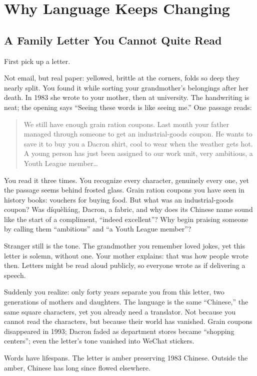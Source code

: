 \chapter{Why Language Keeps Changing}
\section{A Family Letter You Cannot Quite Read}
First pick up a letter.

Not email, but real paper: yellowed, brittle at the corners, folds so deep they nearly split. You found it while sorting your grandmother's belongings after her death. In 1983 she wrote to your mother, then at university. The handwriting is neat; the opening says ``Seeing these words is like seeing me.'' One passage reads:

\begin{quote}
We still have enough grain ration coupons. Last month your father managed through someone to get an industrial-goods coupon. He wants to save it to buy you a Dacron shirt, cool to wear when the weather gets hot. A young person has just been assigned to our work unit, very ambitious, a Youth League member\ldots{}
\end{quote}
You read it three times. You recognize every character, genuinely every one, yet the passage seems behind frosted glass. Grain ration coupons you have seen in history books: vouchers for buying food. But what was an industrial-goods coupon? Was díquèliáng, Dacron, a fabric, and why does its Chinese name sound like the start of a compliment, ``indeed excellent''? Why begin praising someone by calling them ``ambitious'' and ``a Youth League member''?

Stranger still is the tone. The grandmother you remember loved jokes, yet this letter is solemn, without one. Your mother explains: that was how people wrote then. Letters might be read aloud publicly, so everyone wrote as if delivering a speech.

Suddenly you realize: only forty years separate you from this letter, two generations of mothers and daughters. The language is the same ``Chinese,'' the same square characters, yet you already need a translator. Not because you cannot read the characters, but because their world has vanished. Grain coupons disappeared in 1993; Dacron faded as department stores became ``shopping centers''; even the letter's tone vanished into WeChat stickers.

Words have lifespans. The letter is amber preserving 1983 Chinese. Outside the amber, Chinese has long since flowed elsewhere.

